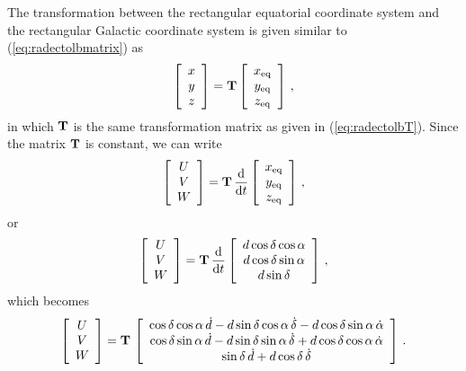 The transformation between the rectangular equatorial coordinate
system and the rectangular Galactic coordinate system is given similar
to (\ref{eq:radectolbmatrix}) as
\begin{equation}\label{eq:receqtorecgal}
\left[ \begin{array}{c} x \\ y \\ z \end{array} \right] =
\mathbf{T} \left[ \begin{array}{c} x_{\textnormal{eq}} \\ y_{\textnormal{eq}} \\ z_{\textnormal{eq}} \end{array} \right]\, ,
\end{equation}
in which $\mathbf{T}$ is the same transformation matrix as given in
(\ref{eq:radectolbT}). Since the matrix $\mathbf{T}$ is constant, we can
write
\begin{equation}
\left[ \begin{array}{c} U \\ V \\ W \end{array} \right] =
\mathbf{T}\,  \frac{\mathrm{d}}{\mathrm{d} t} \left[  \begin{array}{c} x_{\textnormal{eq}} \\ y_{\textnormal{eq}} \\ z_{\textnormal{eq}} \end{array} \right]\, ,
\end{equation}
or
\begin{equation}
\left[ \begin{array}{c} U \\ V \\ W \end{array} \right] =
\mathbf{T}\,  \frac{\mathrm{d}}{\mathrm{d} t} \left[  \begin{array}{c} d \cos \delta \cos \alpha \\ d \cos \delta \sin \alpha \\ d \sin \delta \end{array} \right]\, ,
\end{equation}
which becomes
\begin{equation}\label{eq:simplifyddtradec1}
\left[ \begin{array}{c} U \\ V \\ W \end{array} \right] =
\mathbf{T}\, \left[  \begin{array}{c} 
\cos \delta \cos \alpha\, \dot{d} - d \sin \delta \cos \alpha\, \dot{\delta} - d \cos \delta \sin \alpha\, \dot{\alpha}
\\ \cos \delta \sin \alpha\, \dot{d} - d \sin \delta \sin \alpha\, \dot{\delta} + d \cos \delta \cos \alpha\, \dot{\alpha} 
\\ \sin \delta\, \dot{d} + d \cos \delta\, \dot{\delta} \end{array} \right]\, .
\end{equation}
